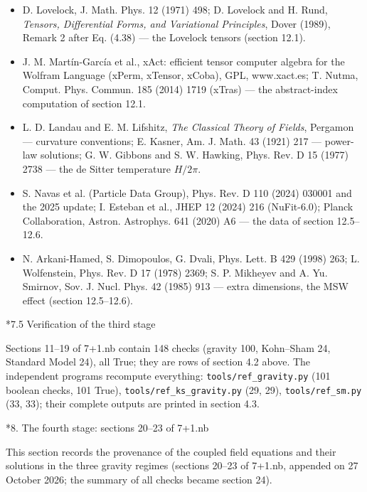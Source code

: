 \documentclass[10pt,a4paper]{article}
\makeatletter
\renewcommand\section{\@startsection{section}{1}{\z@}{-3.5ex \@plus -1ex \@minus -.2ex}{2.3ex \@plus.2ex}{\normalfont\Large\bfseries\raggedright}}
\renewcommand\subsection{\@startsection{subsection}{2}{\z@}{-3.25ex\@plus -1ex \@minus -.2ex}{1.5ex \@plus .2ex}{\normalfont\large\bfseries\raggedright}}
\makeatother
\begin{document}
\begin{itemize}
\item D. Lovelock, J. Math. Phys. 12 (1971) 498; D. Lovelock and H. Rund, \emph{Tensors, Differential Forms, and Variational Principles}, Dover (1989), Remark 2 after Eq. (4.38) — the Lovelock tensors (section 12.1).
\item J. M. Martín-García et al., xAct: efficient tensor computer algebra for the Wolfram Language (xPerm, xTensor, xCoba), GPL, www.xact.es; T. Nutma, Comput. Phys. Commun. 185 (2014) 1719 (xTras) — the abstract-index computation of section 12.1.
\item L. D. Landau and E. M. Lifshitz, \emph{The Classical Theory of Fields}, Pergamon — curvature conventions; E. Kasner, Am. J. Math. 43 (1921) 217 — power-law solutions; G. W. Gibbons and S. W. Hawking, Phys. Rev. D 15 (1977) 2738 — the de Sitter temperature $H/2\pi$.
\item S. Navas et al. (Particle Data Group), Phys. Rev. D 110 (2024) 030001 and the 2025 update; I. Esteban et al., JHEP 12 (2024) 216 (NuFit-6.0); Planck Collaboration, Astron. Astrophys. 641 (2020) A6 — the data of section 12.5–12.6.
\item N. Arkani-Hamed, S. Dimopoulos, G. Dvali, Phys. Lett. B 429 (1998) 263; L. Wolfenstein, Phys. Rev. D 17 (1978) 2369; S. P. Mikheyev and A. Yu. Smirnov, Sov. J. Nucl. Phys. 42 (1985) 913 — extra dimensions, the MSW effect (section 12.5–12.6).
\end{itemize}
\subsection*{7.5 Verification of the third stage}
Sections 11–19 of 7+1.nb contain 148 checks (gravity 100, Kohn–Sham 24, Standard Model 24), all True; they are rows of section 4.2 above. The independent programs recompute everything: \texttt{tools/\allowbreak{}ref\_\allowbreak{}gravity.py} (101 boolean checks, 101 True), \texttt{tools/\allowbreak{}ref\_\allowbreak{}ks\_\allowbreak{}gravity.py} (29, 29), \texttt{tools/\allowbreak{}ref\_\allowbreak{}sm.py} (33, 33); their complete outputs are printed in section 4.3.

\section*{8. The fourth stage: sections 20–23 of 7+1.nb}
This section records the provenance of the coupled field equations and their solutions in the three gravity regimes (sections 20–23 of 7+1.nb, appended on 27 October 2026; the summary of all checks became section 24).
\end{document}
